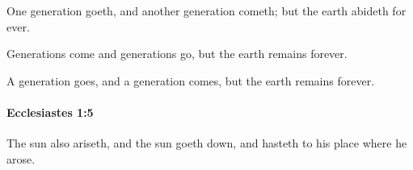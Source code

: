 			\begin{versebox}
					\item[BHS] 
					\item[LXX] 
					\item[ASV] One generation goeth, and another generation cometh; but the earth abideth for ever.
					\item[NIV] Generations come and generations go, but the earth remains forever.
					\item[NRSV] A generation goes, and a generation comes, but the earth remains forever.
			\end{versebox}

		\paragraph{Ecclesiastes 1:5} %
			\label{ECCLESIASTES-1-5}

			The sun also ariseth, and the sun goeth down, and hasteth to his place where he arose.


